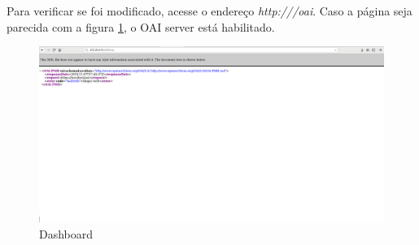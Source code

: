\documentclass[12pt,hidelinks]{article}
\begin{document}
Para verificar se foi modificado, acesse o endereço \textit{http://\color[red]{URL DO DATAVERSE}/oai}. Caso a página seja parecida com a figura \ref{img06.png}, o OAI server está habilitado.

\begin{figure}[!htp]
    \centering
      \includegraphics[scale=0.2]{imagens/06.png}
        \caption{Dashboard}
    \label{img06.png}
 \end{figure}
\end{document}
